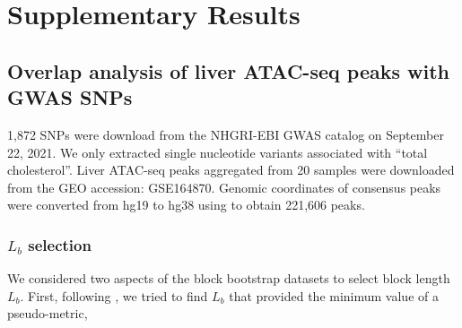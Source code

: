 \documentclass{article}
\begin{document}
\section{Supplementary Results} \label{sec:results}

\subsection{Overlap analysis of liver ATAC-seq peaks with GWAS SNPs}

1,872 SNPs were download from the NHGRI-EBI GWAS catalog
\citep{gwascatalog} on September 22, 2021. We only extracted single
nucleotide variants associated with ``total cholesterol''. Liver ATAC-seq peaks
\citep{CURRIN20211169} aggregated from 20 samples were downloaded from
the GEO accession: GSE164870.
Genomic coordinates of consensus peaks were converted from hg19 to
hg38 using  to obtain 221,606 peaks.


\subsubsection{$L_b$ selection}\label{sec:length}


We considered two aspects of the block bootstrap datasets to select
block length $L_b$.
First, following \citet{bickel2010subsampling}, we tried to find $L_b$
that provided the minimum value of a pseudo-metric,
\end{document}
